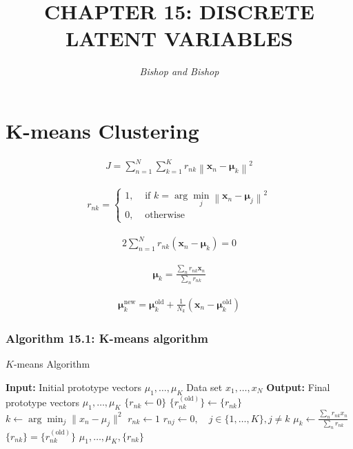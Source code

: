 \documentclass{article}
\title{\LARGE\scshape\MakeUppercase{Chapter 15: Discrete Latent Variables}}
\author{\textit{Bishop and Bishop}}
\date{}
\begin{document}
\maketitle

\section{K-means Clustering}

\begin{align*}
J=\sum_{n=1}^{N} \sum_{k=1}^{K} r_{n k}\left\|\mathbf{x}_{n}-\boldsymbol{\mu}_{k}\right\|^{2}
\tag{15.1}
\end{align*}

\begin{align*}
r_{n k}= \begin{cases}
1, & \text{ if } k=\arg \min _{j}\left\|\mathbf{x}_{n}-\boldsymbol{\mu}_{j}\right\|^{2}  \\
0, & \text{ otherwise }
\end{cases}
\tag{15.2}
\end{align*}

\begin{align*}
2 \sum_{n=1}^{N} r_{n k}\left(\mathbf{x}_{n}-\boldsymbol{\mu}_{k}\right)=0
\tag{15.3}
\end{align*}

\begin{align*}
\boldsymbol{\mu}_{k}=\frac{\sum_{n} r_{n k} \mathbf{x}_{n}}{\sum_{n} r_{n k}}
\tag{15.4}
\end{align*}

\begin{align*}
\boldsymbol{\mu}_{k}^{\text{new}}=\boldsymbol{\mu}_{k}^{\text{old}}+\frac{1}{N_{k}}\left(\mathbf{x}_{n}-\boldsymbol{\mu}_{k}^{\text{old}}\right)
\tag{15.5}
\end{align*}

\subsubsection{Algorithm 15.1: K-means algorithm}

\begin{algorithm}
\caption{$K$-means Algorithm}
\begin{algorithmic}[1]
\STATE \textbf{Input:} Initial prototype vectors $\mu_1, \ldots, \mu_K$
\STATE \quad Data set $x_1, \ldots, x_N$
\STATE \textbf{Output:} Final prototype vectors $\mu_1, \ldots, \mu_K$
\STATE $\{r_{nk} \gets 0\}$ 
\REPEAT
    \STATE $\{r_{nk}^{(\text{old})}\} \gets \{r_{nk}\}$
        \STATE $k \gets \arg \min_{j} \|x_n - \mu_j\|^2$
        \STATE $r_{nk} \gets 1$
        \STATE $r_{nj} \gets 0, \quad j \in \{1, \ldots, K\}, j \neq k$
    \ENDFOR
        \STATE $\mu_k \gets \frac{\sum_n r_{nk} x_n}{\sum_n r_{nk}}$
    \ENDFOR
\UNTIL $\{r_{nk}\} = \{r_{nk}^{(\text{old})}\}$ 
\RETURN $\mu_1, \ldots, \mu_K, \{r_{nk}\}$
\end{algorithmic}
\end{algorithm}
\end{document}
